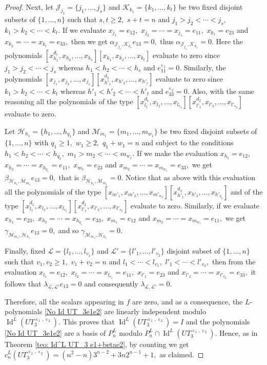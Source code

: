 \documentclass[a4paper,reqno]{amsart}
\theoremstyle{definition}
\numberwithin{equation}{section}
\numberwithin{theorem}{section}
\DeclareMathOperator{\I}{Id}
\DeclareMathOperator{\e}{\varepsilon}
\begin{document}
\begin{proof}
Next, let $\mathcal{J}_{j_1}=\{j_1,\ldots,j_s\}$ and $\mathcal{K}_{k_1}=\{k_1,\ldots,k_t\}$ be two fixed disjoint subsets of $\{1,\ldots,n\}$ such that $s,t\geq 2,$ $s+t=n$ and $j_1>j_2<  \cdots < j_s,$ $k_1>k_2<  \cdots < k_t.$ If we evaluate
$ x_{j_1}= e_{12},$  $x_{j_2}=\cdots = x_{j_s}= e_{11},$ $ x_{k_1}= e_{23}$ and  $x_{k_2}=\cdots = x_{k_t}= e_{33},$ then we get $\alpha_{ \mathcal{J}_{j_1}, \mathcal{K}_{k_1}} e_{13}=0,$ thus $\alpha_{ \mathcal{J}_{j_1}, \mathcal{K}_{k_1}}=0.$
Here the polynomials  $[x_{h_1}^{d_1},x_{h_2},\dots,x_{h_{s}}][x_{k_1},x_{k_2},\dots,x_{k_{t}}]$  evaluate to zero since $j_1>j_2<  \cdots < j_s$ whereas $h_1<h_2<\cdots <h_{s}$ and $e_{11}^{\e_1}=0.$ Similarly, the polynomials  $[x_{j_1},x_{j_2},\dots,x_{j_s}][x_{h'_1}^{d_2},x_{h'_2},\dots,x_{h'_{t}}]$ evaluate to zero since  $k_1>k_2<  \cdots < k_t$ whereas $h'_1<h'_2<\cdots <h'_t$ and $e_{33}^{\e_2}=0.$
Also, with the same reasoning all the polynomials of the type $[x_{l_1}^{d_1},x_{l_2},\dots,x_{l_{v_1}}][x_{l'_1}^{d_2},x_{l'_2},\dots,x_{l'_{v_2}}]$ evaluate to zero.

Let $\mathcal{H}_{h_1}=\{h_1,\ldots,h_{q_1}\}$ and  $\mathcal{M}_{m_1}=\{m_1,\ldots,m_{w_1}\}$ be two fixed disjoint subsets of $\{1,\ldots,n\}$ with $q_1\geq 1,$ $w_1\geq 2,$ $q_1+w_1=n$ and subject to the conditions $h_1<h_2<  \cdots < h_{q_1},$ $m_1>m_2<  \cdots < m_{w_1}.$ If we make the evaluation $x_{h_1}=e_{12},$ $x_{h_2}=\cdots = x_{h_{q_1}}= e_{11},$ $x_{m_1}=e_{23}$ and $x_{m_2}= \cdots = x_{m_{w_1}}= e_{33},$ we get $\beta_{\mathcal{H}_{h_1}, \mathcal{M}_{m_1}}e_{13}=0,$ that is $\beta_{\mathcal{H}_{h_1}, \mathcal{M}_{m_1}}=0.$ Notice that as above with this evaluation all the polynomials of the type $[x_{m'_1},x_{m'_2},\dots,x_{m'_{w_2}}][x_{h'_1}^{d_2},x_{h'_2},\dots,x_{h'_{q_2}}]$ and of the type $[x_{l_1}^{d_1},x_{l_2},\dots,x_{l_{v_1}}][x_{l'_1}^{d_2},x_{l'_2},\dots,x_{l'_{v_2}}]$ evaluate to zero.
Similarly, if we evaluate $x_{h_1}=e_{23},$ $x_{h_2}=\cdots = x_{h_{q_1}}= e_{33},$ $x_{m_1}=e_{12}$ and $x_{m_2}= \cdots = x_{m_{w_1}}= e_{11},$ we get $\gamma_{\mathcal{M}_{m_1}, \mathcal{H}_{h_1}}e_{13}=0,$ and so $\gamma_{\mathcal{M}_{m_1}, \mathcal{H}_{h_1}}=0.$

Finally, fixed $\mathcal{L}=\{l_1,\ldots,l_{v_1}\}$ and $\mathcal{L}'=\{l'_1,\ldots,l'_{v_2}\}$ disjoint subset of $\{1,\ldots,n\}$ such that $v_1,v_2\geq 1,$ $v_1+v_2=n$ and $l_1< \cdots < l_{v_1},$ $l'_1<  \cdots < l'_{v_2},$ then from the evaluation  $x_{l_1}=e_{12},$ $x_{l_2}=\cdots = x_{l_{v_1}}= e_{11},$ $x_{l'_1}=e_{23}$ and $x_{l'_2}= \cdots = x_{l'_{v_2}}= e_{33},$ it follows that $\lambda_{\mathcal{L}, \mathcal{L}'}e_{13}=0$ and consequently $\lambda_{\mathcal{L}, \mathcal{L}'}=0.$ 

Therefore, all the scalars appearing in $f$ are zero, and as a consequence, the $L$-polynomials  \eqref{No Id UT_3e1e2} are linearly independent modulo $\I^L(UT_3^{\e_1,\e_2}).$ This proves that $\I^L(UT_3^{\e_1,\e_2})= I$ and the polynomials \eqref{No Id UT_3e1e2} are a basis of $P_n^L$ modulo $P_n^L\cap \I^L(UT_3^{\e_1,\e_2}).$ Hence, as in Theorem \ref{teo: Id^L UT_3 e1+betae2}, by counting we get
   $ c_n^L(UT_3^{\e_1,\e_2})=(n^2-n)3^{n-2}+3n2^{n-1}+1,$ as claimed.
\end{proof}
\end{document}
